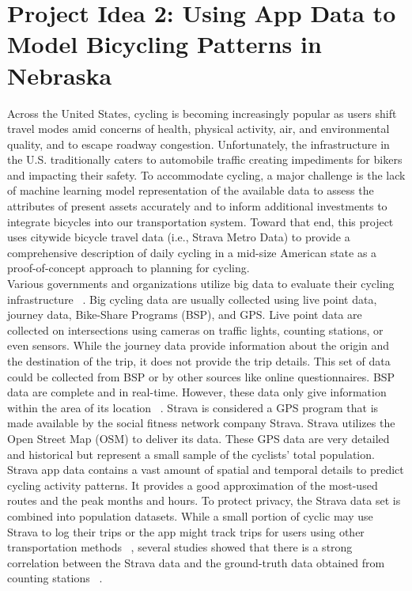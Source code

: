 \documentclass{report}
\begin{document}
\section{Project Idea 2: Using App Data to Model Bicycling Patterns in Nebraska}

Across the United States, cycling is becoming increasingly popular as users shift travel modes amid concerns of health, physical activity, air, and environmental quality, and to escape roadway congestion. Unfortunately, the infrastructure in the U.S. traditionally caters to automobile traffic creating impediments for bikers and impacting their safety. To accommodate cycling, a major challenge is the lack of machine learning model representation of the available data to assess the attributes of present assets accurately and to inform additional investments to integrate bicycles into our transportation system. Toward that end, this project uses citywide bicycle travel data (i.e., Strava Metro Data) to provide a comprehensive description of daily cycling in a mid-size American state as a proof-of-concept approach to planning for cycling. 
\\Various governments and organizations utilize big data to evaluate their cycling infrastructure ~\cite{hall2012open}. Big cycling data are usually collected using live point data, journey data, Bike-Share Programs (BSP), and GPS. Live point data are collected on intersections using cameras on traffic lights, counting stations, or even sensors. While the journey data provide information about the origin and the destination of the trip, it does not provide the trip details. This set of data could be collected from BSP or by other sources like online questionnaires. BSP data are complete and in real-time. However, these data only give information within the area of its location ~\cite{ romanillos2016big, rogers2000counting}. Strava is considered a GPS program that is made available by the social fitness network company Strava. Strava utilizes the Open Street Map (OSM) to deliver its data. These GPS data are very detailed and historical but represent a small sample of the cyclists' total population.  
Strava app data contains a vast amount of spatial and temporal details to predict cycling activity patterns. It provides a good approximation of the most-used routes and the peak months and hours. To protect privacy, the Strava data set is combined into population datasets. While a small portion of cyclic may use Strava to log their trips or the app might track trips for users using other transportation methods ~\cite{hall2012open, romanillos2016big, fishman2016cycling }, several studies showed that there is a strong correlation between the Strava data and the ground-truth data obtained from counting stations ~\cite{hong2020evaluation, jestico2016mapping}. 
\end{document}
